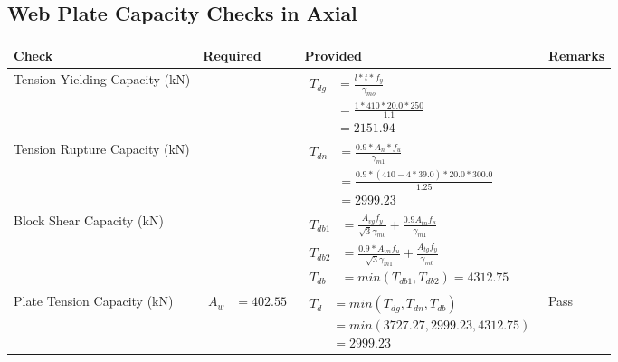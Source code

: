 \documentclass{article}%
\begin{document}
\subsection{Web Plate Capacity Checks in Axial}%
\label{subsec:WebPlateCapacityChecksinAxial}%
\renewcommand{\arraystretch}{1.2}%
\begin{longtable}{|p{4cm}|p{6cm}|p{5.5cm}|p{1.5cm}|}%
\hline%
\rowcolor{OsdagGreen}%
Check&Required&Provided&Remarks\\%
\hline%
\endhead%
\hline%
Tension Yielding Capacity (kN)&&$\begin{aligned} T_{dg} &= \frac{l*t*f_y}{\gamma_{mo}}\\ &=\frac{1*410*20.0*250}{1.1}\\ &=2151.94\end{aligned}$&\\%
\hline%
Tension Rupture Capacity (kN)&&$\begin{aligned} T_{dn} &= \frac{0.9*A_{n}*f_u}{\gamma_{m1}}\\ &=\frac{0.9*(410-4*39.0)*20.0*300.0}{1.25}\\ &=2999.23\end{aligned}$&\\%
\hline%
Block Shear Capacity (kN)&&$\begin{aligned}T_{db1} &= \frac{A_{vg} f_{y}}{\sqrt{3} \gamma_{m0}} + \frac{0.9 A_{tn} f_{u}}{\gamma_{m1}}\\ T_{db2} &= \frac{0.9*A_{vn} f_{u}}{\sqrt{3} \gamma_{m1}} + \frac{A_{tg} f_{y}}{\gamma_{m0}}\\ T_{db} &= min(T_{db1}, T_{db2})= 4312.75\end{aligned}$&\\%
\hline%
Plate Tension Capacity (kN)&$\begin{aligned} A_w &=402.55\end{aligned}$&$\begin{aligned} T_d &= min(T_{dg},T_{dn},T_{db})\\ &= min(3727.27,2999.23,4312.75)\\ &=2999.23\end{aligned}$&Pass\\%
\hline%
\end{longtable}

%
\newpage%
\end{document}
